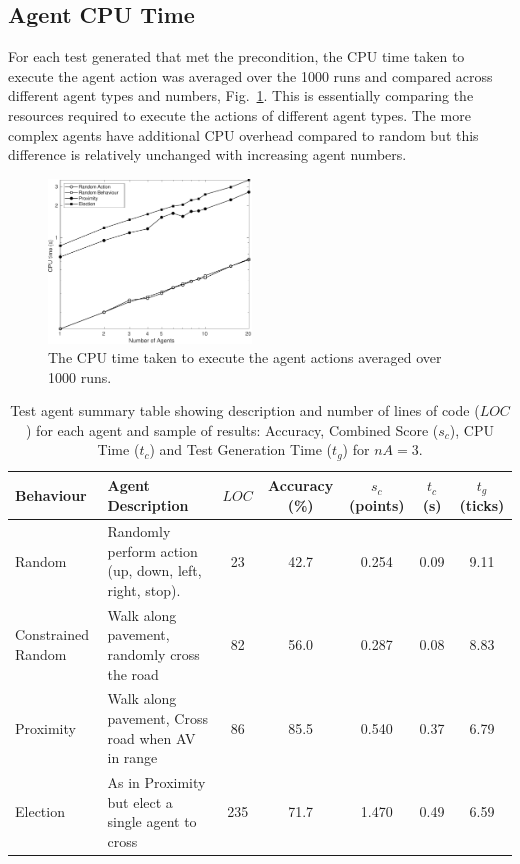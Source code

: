 \documentclass[letterpaper, 10 pt, journal, twoside]{IEEEtran}
\begin{document}
\subsection{Agent CPU Time}
For each test generated that met the precondition, the CPU time taken to execute the agent action was averaged over the 1000 runs and compared across different agent types and numbers, Fig.~\ref{CPUTime}. This is essentially comparing the resources required to execute the actions of different agent types. The more complex agents have additional CPU overhead compared to random but this difference is relatively unchanged with increasing agent numbers. 

\begin{figure}[!t]
	\centering
\includegraphics[width=0.48\textwidth]{TimeCPU_log.pdf}
	\caption{The CPU time taken to execute the agent actions averaged over 1000 runs.}
	\label{CPUTime}
\end{figure}


\begin{table}
\centering
\caption{Test agent summary table showing description and number of lines of code ($LOC$) for each agent and sample of results: Accuracy, Combined Score ($s_c$), CPU Time ($t_{c}$) and Test Generation Time ($t_{g}$) for $nA=3$.}
\label{ResultsTable}
\begin{tabular}{|l|p{6.2cm}|c||c|c|c|c|}
\hline
\textbf{Behaviour} & \textbf{Agent Description} & $LOC$ & Accuracy (\%) & $s_c$ (points)&  $t_{c}$ (s) & $t_{g}$ (ticks) \\
\hline
Random & Randomly perform action (up, down, left, right, stop). 		&  23& 42.7 & 0.254 & 0.09 & 9.11 \\
Constrained Random & Walk along pavement, randomly cross the road 		&  82& 56.0 & 0.287 & 0.08 & 8.83 \\
Proximity & Walk along pavement, Cross road when AV in range 			&  86& 85.5 & 0.540 & 0.37 & 6.79 \\
Election & As in Proximity but elect a single agent to cross 			& 235& 71.7 & 1.470 & 0.49 & 6.59 \\
\hline 
\end{tabular}
\end{table}
\end{document}
